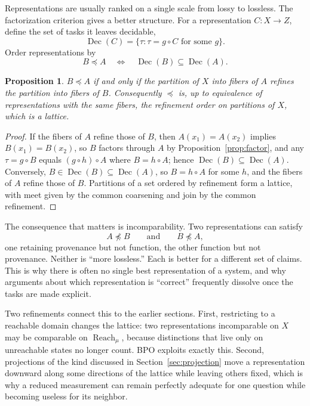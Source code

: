 \documentclass[11pt]{article}
\newtheorem{proposition}{Proposition}
\theoremstyle{remark}
\DeclareMathOperator{\Reach}{Reach}
\DeclareMathOperator{\Dec}{Dec}
\begin{document}
Representations are usually ranked on a single scale from lossy to lossless. The factorization criterion gives a better structure. For a representation $C:X\to Z$, define the set of tasks it leaves decidable,
\[
\Dec(C)=\{\tau : \tau = g\circ C\text{ for some }g\}.
\]
Order representations by
\[
B\preceq A\quad\Longleftrightarrow\quad\Dec(B)\subseteq\Dec(A).
\]

\begin{proposition}\label{prop:lattice}
$B\preceq A$ if and only if the partition of $X$ into fibers of $A$ refines the partition into fibers of $B$. Consequently $\preceq$ is, up to equivalence of representations with the same fibers, the refinement order on partitions of $X$, which is a lattice.
\end{proposition}

\begin{proof}
If the fibers of $A$ refine those of $B$, then $A(x_1)=A(x_2)$ implies $B(x_1)=B(x_2)$, so $B$ factors through $A$ by Proposition~\ref{prop:factor}, and any $\tau=g\circ B$ equals $(g\circ h)\circ A$ where $B=h\circ A$; hence $\Dec(B)\subseteq\Dec(A)$. Conversely, $B\in\Dec(B)\subseteq\Dec(A)$, so $B=h\circ A$ for some $h$, and the fibers of $A$ refine those of $B$. Partitions of a set ordered by refinement form a lattice, with meet given by the common coarsening and join by the common refinement.
\end{proof}

The consequence that matters is incomparability. Two representations can satisfy
\[
A\not\preceq B\qquad\text{and}\qquad B\not\preceq A,
\]
one retaining provenance but not function, the other function but not provenance. Neither is ``more lossless.'' Each is better for a different set of claims. This is why there is often no single best representation of a system, and why arguments about which representation is ``correct'' frequently dissolve once the tasks are made explicit.

Two refinements connect this to the earlier sections. First, restricting to a reachable domain changes the lattice: two representations incomparable on $X$ may be comparable on $\Reach_\mu$, because distinctions that live only on unreachable states no longer count. BPO exploits exactly this. Second, projections of the kind discussed in Section~\ref{sec:projection} move a representation downward along some directions of the lattice while leaving others fixed, which is why a reduced measurement can remain perfectly adequate for one question while becoming useless for its neighbor.
\end{document}
